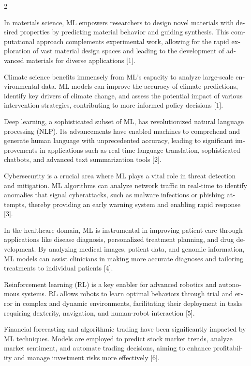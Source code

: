\documentclass{article}
\begin{document}
\begin{multicols}{2}
\begin{otherlanguage}{english}
In materials science, ML empowers researchers to design novel materials with desired properties by predicting material behavior and guiding synthesis. This computational approach complements experimental work, allowing for the rapid exploration of vast material design spaces and leading to the development of advanced materials for diverse applications [1].

Climate science benefits immensely from ML's capacity to analyze large-scale environmental data. ML models can improve the accuracy of climate predictions, identify key drivers of climate change, and assess the potential impact of various intervention strategies, contributing to more informed policy decisions [1].

Deep learning, a sophisticated subset of ML, has revolutionized natural language processing (NLP). Its advancements have enabled machines to comprehend and generate human language with unprecedented accuracy, leading to significant improvements in applications such as real-time language translation, sophisticated chatbots, and advanced text summarization tools [2].

Cybersecurity is a crucial area where ML plays a vital role in threat detection and mitigation. ML algorithms can analyze network traffic in real-time to identify anomalies that signal cyberattacks, such as malware infections or phishing attempts, thereby providing an early warning system and enabling rapid response [3].

In the healthcare domain, ML is instrumental in improving patient care through applications like disease diagnosis, personalized treatment planning, and drug development. By analyzing medical images, patient data, and genomic information, ML models can assist clinicians in making more accurate diagnoses and tailoring treatments to individual patients [4].

Reinforcement learning (RL) is a key enabler for advanced robotics and autonomous systems. RL allows robots to learn optimal behaviors through trial and error in complex and dynamic environments, facilitating their deployment in tasks requiring dexterity, navigation, and human-robot interaction [5].

Financial forecasting and algorithmic trading have been significantly impacted by ML techniques. Models are employed to predict stock market trends, analyze market sentiment, and automate trading decisions, aiming to enhance profitability and manage investment risks more effectively [6].


\end{otherlanguage}
\end{multicols}
\end{document}
